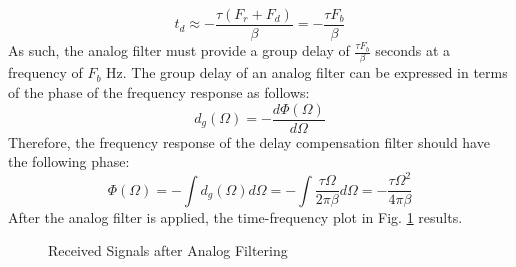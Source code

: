 \documentclass[conference]{IEEEtran}
\begin{document}
\begin{equation}
t_d \approx -\frac{\tau(F_r+F_d)}{\beta} = -\frac{\tau F_b}{\beta}
\end{equation}
As such, the analog filter must provide a group delay of $\frac{\tau F_b}{\beta}$ seconds at a frequency of $F_b$ Hz. The group delay of an analog filter can be expressed in terms of the phase of the frequency response as follows:
\begin{equation}
d_g(\Omega) = -\frac{d\Phi(\Omega)}{d\Omega}
\end{equation}
Therefore, the frequency response of the delay compensation filter should have the following phase:
\begin{equation}
\Phi(\Omega) = -\int d_g(\Omega)d\Omega = -\int\frac{\tau\Omega}{2\pi\beta}d\Omega = -\frac{\tau\Omega^2}{4\pi\beta}
\end{equation}
After the analog filter is applied, the time-frequency plot in Fig. \ref{beat_freq_analog_filt} results.
\begin{figure}[H]
\centerline{}
\caption{Received Signals after Analog Filtering}
\label{beat_freq_analog_filt}
\end{figure}
%
%
\end{document}
